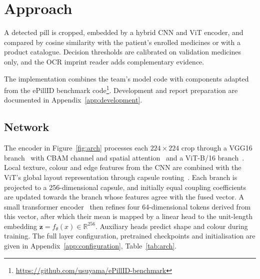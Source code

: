 \section{Approach}
\label{sec:approach}

A detected pill is cropped, embedded by a hybrid CNN and ViT encoder, and compared by cosine similarity with the
patient's enrolled medicines or with a product catalogue. Decision thresholds are calibrated on validation medicines
only, and the OCR imprint reader adds complementary evidence.

The implementation combines the team's model code with components adapted from the ePillID benchmark code\footnote{\url{https://github.com/usuyama/ePillID-benchmark}}. Development and report preparation are documented in Appendix~\ref{app:development}.

\subsection{Network}
\label{sec:arch}

The encoder in Figure~\ref{fig:arch} processes each $224{\times}224$ crop through a VGG16 branch~\citep{simonyan2015vgg} with CBAM channel and spatial attention~\citep{woo2018cbam} and a ViT-B/16 branch~\citep{dosovitskiy2021vit}. Local texture, colour and edge features from the CNN are combined with the ViT's global layout representation through capsule routing~\citep{sabour2017capsules}. Each branch is projected to a 256-dimensional capsule, and initially equal coupling coefficients are updated towards the branch whose features agree with the fused vector. A small transformer encoder~\citep{vaswani2017attention} then refines four 64-dimensional tokens derived from this vector, after which their mean is mapped by a linear head to the unit-length embedding $\mathbf{z}=f_\theta(x)\in\mathbb{R}^{256}$. Auxiliary heads predict shape and colour during training. The full layer configuration, pretrained checkpoints and initialisation are given in Appendix~\ref{app:configuration}, Table~\ref{tab:arch}.

